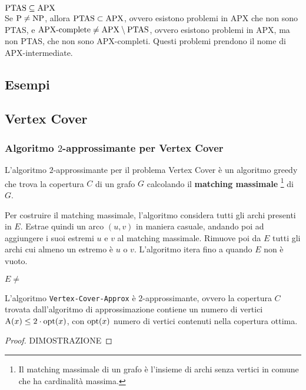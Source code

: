\begin{rem}
    $\textnormal{PTAS} \subseteq \textnormal{APX}$\\
    Se $\textnormal{P} \neq \textnormal{NP}$, allora $\textnormal{PTAS} \subset \textnormal{APX}$, ovvero esistono problemi in APX che non sono PTAS, e $\textnormal{APX-complete} \neq \textnormal{APX} \setminus \textnormal{PTAS}$, ovvero esistono problemi in APX, ma non PTAS, che non sono APX-completi. Questi problemi prendono il nome di APX-intermediate.
\end{rem}

\subsection{Esempi}
\subsection*{Vertex Cover}
\subsubsection{Algoritmo $2$-approssimante per Vertex Cover}
L'algoritmo $2$-approssimante per il problema Vertex Cover è un algoritmo greedy che trova la copertura $C$ di un grafo $G$ calcolando il \textbf{matching massimale} \footnote{Il matching massimale di un grafo è l'insieme di archi senza vertici in comune che ha cardinalità massima.} di $G$. 

Per costruire il matching massimale, l'algoritmo considera tutti gli archi presenti in $E$. Estrae quindi un arco $(u,v)$ in maniera casuale, andando poi ad aggiungere i suoi estremi $u$ e $v$ al matching massimale. Rimuove poi da $E$ tutti gli archi cui almeno un estremo è $u$ o $v$. L'algoritmo itera fino a quando $E$ non è vuoto.

\begin{codebox}
    \li \While $E \neq $
    \End
\end{codebox}

\begin{thm}
    L'algoritmo \verb|Vertex-Cover-Approx| è $2$-approssimante, ovvero la copertura $C$ trovata dall'algoritmo di approssimazione contiene un numero di vertici $\textnormal{A}(x) \le 2 \cdot \textnormal{opt}(x)$, con $\textnormal{opt}(x)$ numero di vertici contenuti nella copertura ottima.
\end{thm}

\begin{proof}
    DIMOSTRAZIONE
\end{proof}

